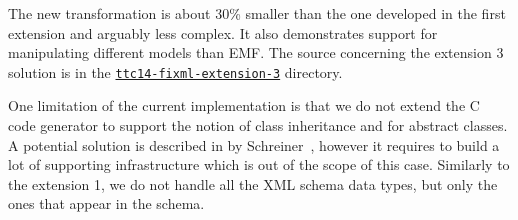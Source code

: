 The new transformation is about 30\% smaller than the one developed in the first extension and arguably less complex.
It also demonstrates \SIGMA support for manipulating different models than EMF.
The source concerning the extension 3 solution is in the \href{https://github.com/fikovnik/ttc14-fixml-sigma/tree/master/ttc14-fixml-extension-3}{\texttt{ttc14-fixml-extension-3}} directory.

One limitation of the current implementation is that we do not extend the C code generator to support the notion of class inheritance and for abstract classes.
A potential solution is described in by Schreiner~\cite{Schreiner1993}, however it requires to build a lot of supporting infrastructure which is out of the scope of this \TTC case.
Similarly to the extension 1, we do not handle all the XML schema data types, but only the ones that appear in the \FIXML schema.
